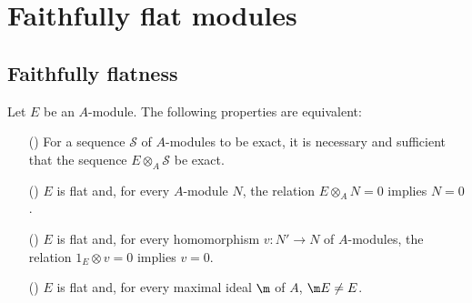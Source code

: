 \section{Faithfully flat modules}
\subsection{Faithfully flatness}
\begin{proposition}\label{module faithfully flat iff}
Let $E$ be an $A$-module. The following properties are equivalent:
\begin{itemize}
\item[(\rmnum{1})] For a sequence $\mathscr{S}$ of $A$-modules to be exact, it is necessary and sufficient that the sequence $E\otimes_A\mathscr{S}$ be exact.
\item[(\rmnum{2})] $E$ is flat and, for every $A$-module $N$, the relation $E\otimes_AN=0$ implies $N=0$.
\item[(\rmnum{3})] $E$ is flat and, for every homomorphism $v:N'\to N$ of $A$-modules, the relation $1_E\otimes v=0$ implies $v=0$.
\item[(\rmnum{4})] $E$ is flat and, for every maximal ideal $\m$ of $A$, $\m E\neq E$.
\end{itemize}
\end{proposition}
